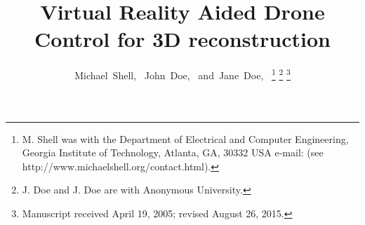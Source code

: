 \documentclass[journal]{IEEEtran}
\begin{document}
%
\title{Virtual Reality Aided Drone Control for 3D reconstruction}
%
%
%


\author{Michael~Shell,~
        John~Doe,~
        and~Jane~Doe,~%
\thanks{M. Shell was with the Department
of Electrical and Computer Engineering, Georgia Institute of Technology, Atlanta,
GA, 30332 USA e-mail: (see http://www.michaelshell.org/contact.html).}%
\thanks{J. Doe and J. Doe are with Anonymous University.}%
\thanks{Manuscript received April 19, 2005; revised August 26, 2015.}}

% 
%
\end{document}
